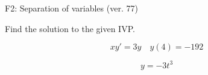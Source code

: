 \begin{exercise}
  \begin{exerciseTitle}F2: Separation of variables (ver. 77)\end{exerciseTitle}
  \begin{exerciseStatement}
    
Find the solution to the given IVP.

    
\[xy'= 3 y \hspace{1em} y( 4 ) = -192\]

  \end{exerciseStatement}
  \begin{exerciseAnswer}
    
\[y= -3 t^ 3\]

  \end{exerciseAnswer}
\end{exercise}